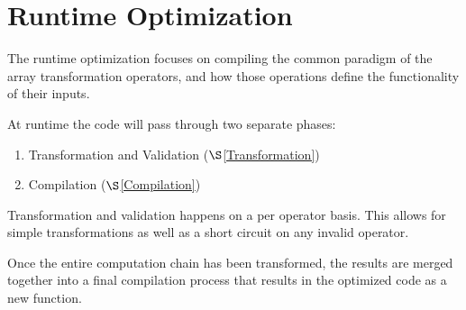 \section{Runtime Optimization}\label{RuntimeOptimization}
The runtime optimization focuses on compiling the common paradigm of the array transformation operators, and how those operations define the functionality of their inputs.

At runtime the code will pass through two separate phases:

\begin{enumerate}
  \item Transformation and Validation ($\S$\ref{Transformation})
  \item Compilation ($\S$\ref{Compilation})
\end{enumerate}

Transformation and validation happens on a per operator basis.  This allows for simple transformations as well as a short circuit on any invalid operator.

Once the entire computation chain has been transformed, the results are merged together into a final compilation process that results in the optimized code as a new function. 

\begin{minipage}{\linewidth}

\end{minipage}


